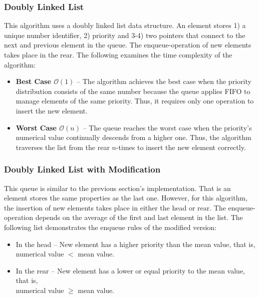 \documentclass[a4paper,11pt]{kth-mag}
\begin{document}
\subsubsection{Doubly Linked List}
This algorithm uses a doubly linked list data structure.
An element stores 1) a unique number identifier, 2) priority and 3-4) two pointers that connect to the next and previous element in the queue.
The enqueue-operation of new elements takes place in the rear.
The following examines the time complexity of the algorithm:
\begin{itemize}
    \item \textbf{Best Case $\mathcal{O}(1)$} --
        The algorithm achieves the best case when the priority distribution consists of the same number because the queue applies FIFO to manage elements of the same priority.
        Thus, it requires only one operation to insert the new element.
    \item \textbf{Worst Case $\mathcal{O}(n)$} --
        The queue reaches the worst case when the priority's numerical value continually descends from a higher one.
        Thus, the algorithm traverses the list from the rear $n$-times to insert the new element correctly.
\end{itemize}

\subsubsection{Doubly Linked List with Modification}
This queue is similar to the previous section's implementation.
That is an element stores the same properties as the last one.
However, for this algorithm, the insertion of new elements takes place in either the head or rear.
The enqueue-operation depends on the average of the first and last element in the list.
The following list demonstrates the enqueue rules of the modified version:
\begin{itemize}
    \item In the head -- New element has a higher priority than the mean value, that is, \\numerical value $<$ mean value.
    \item In the rear -- New element has a lower or equal priority to the mean value, that is,\\numerical value $\ge$ mean value.
\end{itemize}
\end{document}
